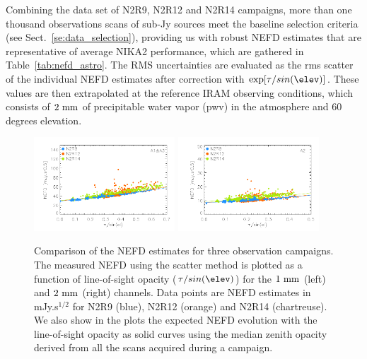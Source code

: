Combining the data set of N2R9, N2R12 and N2R14 campaigns,
more than one thousand observations scans of sub-Jy sources meet the
baseline selection criteria (see Sect.~\ref{se:data_selection}),
providing us with robust NEFD estimates that are representative of
average NIKA2 performance, which are gathered in
Table~\ref{tab:nefd_astro}.
The RMS uncertainties are evaluated as the rms scatter of the
individual NEFD estimates after correction with
$\exp[\tau/sin(\elev)]$. These values are then extrapolated at the
reference IRAM observing conditions, which consists of $2~\rm{mm}$
of precipitable water vapor (pwv) in the atmosphere and $60$ degrees
elevation.  

\begin{figure}[!thbp]
\begin{center}
\includegraphics[clip=true,width=0.47\textwidth]{Figures/plot_nefd_vs_obstau_corrected_skydip_vfinal_1mm.pdf}
\includegraphics[clip=true,width=0.47\textwidth]{Figures/plot_nefd_vs_obstau_corrected_skydip_vfinal_a2.pdf}
\caption{Comparison of the NEFD estimates for three observation
  campaigns. The measured NEFD using the scatter method is plotted as a function of
  line-of-sight opacity ($\tau/sin(\elev)$) for the $1~\rm{mm}$ (left) and $2~\rm{mm}$ (right)
  channels. Data points are NEFD estimates in mJy.s$^{1/2}$ for N2R9 (blue), N2R12 (orange)
  and N2R14 (chartreuse). We also show in the plots the expected NEFD evolution
  with the line-of-sight opacity as solid curves using the median
  zenith opacity derived from all the scans acquired during a campaign.}
\label{fig:nefdvsbackground_below_1Jy}
\end{center}
\end{figure}


